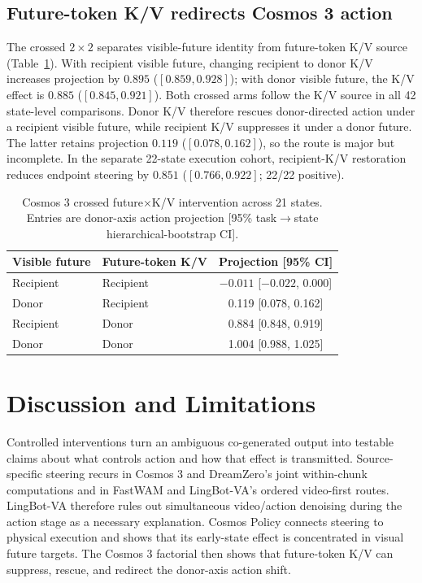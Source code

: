 \subsection{Future-token K/V redirects Cosmos 3 action}

The crossed $2\times2$ separates visible-future identity from future-token K/V source (Table~\ref{tab:kv_short}). With recipient visible future, changing recipient to donor K/V increases projection by $0.895$ ($[0.859,0.928]$); with donor visible future, the K/V effect is $0.885$ ($[0.845,0.921]$). Both crossed arms follow the K/V source in all 42 state-level comparisons. Donor K/V therefore rescues donor-directed action under a recipient visible future, while recipient K/V suppresses it under a donor future. The latter retains projection $0.119$ ($[0.078,0.162]$), so the route is major but incomplete. In the separate 22-state execution cohort, recipient-K/V restoration reduces endpoint steering by $0.851$ ($[0.766,0.922]$; 22/22 positive).

\begin{table}[t]
  \centering
  \caption{Cosmos 3 crossed future$\times$K/V intervention across 21 states. Entries are donor-axis action projection [95\% task$\rightarrow$state hierarchical-bootstrap CI].}
  \label{tab:kv_short}
  \scriptsize
  \setlength{\tabcolsep}{6pt}
  \begin{tabular}{@{}llc@{}}
    \toprule
    Visible future & Future-token K/V & Projection [95\% CI] \\
    \midrule
    Recipient & Recipient & $-0.011$ [$-0.022$, 0.000] \\
    Donor & Recipient & 0.119 [0.078, 0.162] \\
    Recipient & Donor & 0.884 [0.848, 0.919] \\
    Donor & Donor & 1.004 [0.988, 1.025] \\
    \bottomrule
  \end{tabular}
\end{table}

\section{Discussion and Limitations}

Controlled interventions turn an ambiguous co-generated output into testable claims about what controls action and how that effect is transmitted. Source-specific steering recurs in Cosmos 3 and DreamZero's joint within-chunk computations and in FastWAM and LingBot-VA's ordered video-first routes. LingBot-VA therefore rules out simultaneous video/action denoising during the action stage as a necessary explanation. Cosmos Policy connects steering to physical execution and shows that its early-state effect is concentrated in visual future targets. The Cosmos 3 factorial then shows that future-token K/V can suppress, rescue, and redirect the donor-axis action shift.

